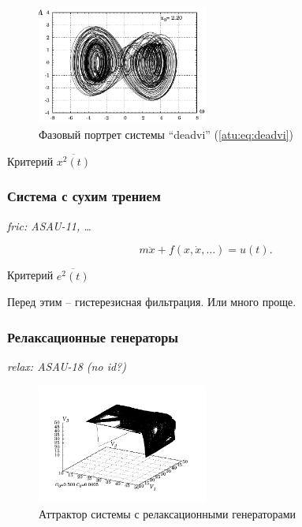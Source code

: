\documentclass[a4paper,12pt]{article}
\newcommand{\LinkRef}[1]{ \textit{#1} }
\begin{document}
\begin{figure}[htb!]
\centerline{\includegraphics[width=0.5\textwidth]{p/cha/deadvi_phase.pdf} }
\caption{Фазовый портрет системы ``deadvi'' (\ref{atu:eq:deadvi})}
\label{atu:f:deadvi_phase}
\end{figure}

Критерий
$\overline{x^2(t)}$



\FloatBarrier
\subsubsection{Система с сухим трением}

\LinkRef{
  fric: ASAU-11, \ldots
}

\begin{equation}
 m \ddot{x} + f( x, \dot{x}, \ldots)  = u(t).
\label{atu:eq:dryfric_example}
\end{equation}

Критерий
$\overline{e^2(t)}$

Перед этим -- гистерезисная фильтрация.
Или много проще.



\FloatBarrier
\subsubsection{Релаксационные генераторы}


\LinkRef{
  relax: ASAU-18 (no id?)
}

\begin{figure}[htb!]
\centerline{\includegraphics[width=0.5\textwidth]{p/cha/relax_phase3_0500.pdf} }
\caption{Аттрактор системы с релаксационными генераторами}
\label{atu:f:relax_phase3}
\end{figure}
\end{document}
